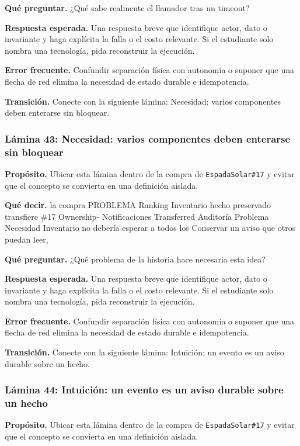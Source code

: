 \documentclass[variant=docente,cover=institutional,mode=screen]{ua-engineering-v6-article}
\begin{document}
\textbf{Qué preguntar.} ¿Qué sabe realmente el llamador tras un timeout?

\textbf{Respuesta esperada.} Una respuesta breve que identifique actor, dato o invariante y haga explícita la falla o el costo relevante. Si el estudiante solo nombra una tecnología, pida reconstruir la ejecución.

\textbf{Error frecuente.} Confundir separación física con autonomía o suponer que una flecha de red elimina la necesidad de estado durable e idempotencia.

\textbf{Transición.} Conecte con la siguiente lámina: Necesidad: varios componentes deben enterarse sin bloquear.

\subsubsection*{Lámina 43: Necesidad: varios componentes deben enterarse sin bloquear}
\textbf{Propósito.} Ubicar esta lámina dentro de la compra de \texttt{EspadaSolar\#17} y evitar que el concepto se convierta en una definición aislada.

\textbf{Qué decir.} la compra PROBLEMA Ranking Inventario hecho preservado transfiere \#17 Ownership- Notificaciones Transferred Auditoría Problema Necesidad Inventario no debería esperar a todos los Conservar un aviso que otros puedan leer,

\textbf{Qué preguntar.} ¿Qué problema de la historia hace necesaria esta idea?

\textbf{Respuesta esperada.} Una respuesta breve que identifique actor, dato o invariante y haga explícita la falla o el costo relevante. Si el estudiante solo nombra una tecnología, pida reconstruir la ejecución.

\textbf{Error frecuente.} Confundir separación física con autonomía o suponer que una flecha de red elimina la necesidad de estado durable e idempotencia.

\textbf{Transición.} Conecte con la siguiente lámina: Intuición: un evento es un aviso durable sobre un hecho.

\subsubsection*{Lámina 44: Intuición: un evento es un aviso durable sobre un hecho}
\textbf{Propósito.} Ubicar esta lámina dentro de la compra de \texttt{EspadaSolar\#17} y evitar que el concepto se convierta en una definición aislada.
\end{document}

